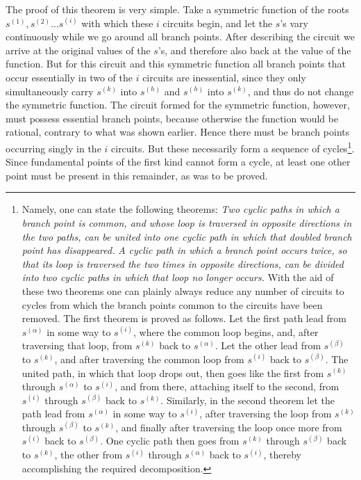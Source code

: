 \documentclass[10pt]{article}
\begin{document}
The proof of this theorem is very simple. Take a symmetric function of the roots \(s^{(1)},s^{(2)}\ldots s^{(i)}\) with which these \(i\) circuits begin, and let the \(s\)'s vary continuously while we go around all branch points. After describing the circuit we arrive at the original values of the \(s\)'s, and therefore also back at the value of the function. But for this circuit and this symmetric function all branch points that occur essentially in two of the \(i\) circuits are inessential, since they only simultaneously carry \(s^{(k)}\) into \(s^{(h)}\) and \(s^{(h)}\) into \(s^{(k)}\), and thus do not change the symmetric function. The circuit formed for the symmetric function, however, must possess essential branch points, because otherwise the function would be rational, contrary to what was shown earlier. Hence there must be branch points occurring singly in the \(i\) circuits. But these necessarily form a sequence of cycles\footnote{Namely, one can state the following theorems: \emph{Two cyclic paths in which a branch point is common, and whose loop is traversed in opposite directions in the two paths, can be united into one cyclic path in which that doubled branch point has disappeared.} \emph{A cyclic path in which a branch point occurs twice, so that its loop is traversed the two times in opposite directions, can be divided into two cyclic paths in which that loop no longer occurs.} With the aid of these two theorems one can plainly always reduce any number of circuits to cycles from which the branch points common to the circuits have been removed. The first theorem is proved as follows. Let the first path lead from \(s^{(\alpha)}\) in some way to \(s^{(i)}\), where the common loop begins, and, after traversing that loop, from \(s^{(k)}\) back to \(s^{(\alpha)}\). Let the other lead from \(s^{(\beta)}\) to \(s^{(k)}\), and after traversing the common loop from \(s^{(i)}\) back to \(s^{(\beta)}\). The united path, in which that loop drops out, then goes like the first from \(s^{(k)}\) through \(s^{(\alpha)}\) to \(s^{(i)}\), and from there, attaching itself to the second, from \(s^{(i)}\) through \(s^{(\beta)}\) back to \(s^{(k)}\). Similarly, in the second theorem let the path lead from \(s^{(\alpha)}\) in some way to \(s^{(i)}\), after traversing the loop from \(s^{(k)}\) through \(s^{(\beta)}\) to \(s^{(k)}\), and finally after traversing the loop once more from \(s^{(i)}\) back to \(s^{(\beta)}\). One cyclic path then goes from \(s^{(k)}\) through \(s^{(\beta)}\) back to \(s^{(k)}\), the other from \(s^{(i)}\) through \(s^{(\alpha)}\) back to \(s^{(i)}\), thereby accomplishing the required decomposition.}. Since fundamental points of the first kind cannot form a cycle, at least one other point must be present in this remainder, as was to be proved.
\end{document}
